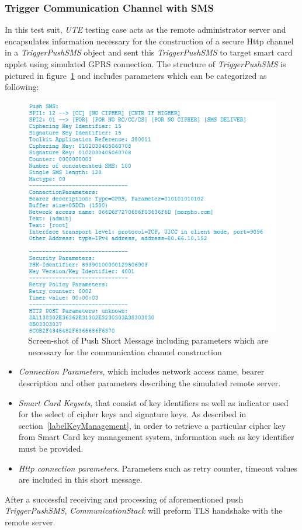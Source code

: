 \subsubsection{Trigger Communication Channel with SMS} \label{secAppletTest1}
In this test suit, \emph{UTE} testing case acts as the remote administrator server and encapsulates information necessary for the construction of a secure Http channel in a \emph{TriggerPushSMS} object and sent this \emph{TriggerPushSMS} to target smart card applet using simulated GPRS connection. The structure of \emph{TriggerPushSMS}  is pictured in figure~\ref{fig:push-sms} and includes parameters which can be categorized as following:
\begin{figure}[!htb]
	\centering
	\includegraphics[width=1.0\textwidth]{Images/impl/push-sms.png}
		\caption{Screen-shot of Push Short Message including parameters which are necessary for the communication channel construction}
	\label{fig:push-sms}
\end{figure}
\begin{itemize}
\item \emph{Connection Parameters}, which includes network access name, bearer description and other parameters describing the simulated remote server.
\item \emph{Smart Card Keysets}, that consist of key identifiers as well as indicator used for the select of cipher keys and signature keys. As described in section~\ref{labelKeyManagement}, in order to retrieve a particular cipher key from Smart Card  key management system, information such as key identifier must be provided.
\item \emph{Http connection parameters}. Parameters such as retry counter, timeout values are included in this short message.
\end{itemize}
After a successful receiving and processing of aforementioned push \emph{TriggerPushSMS}, \emph{CommunicationStack} will preform TLS handshake with the remote server. 

